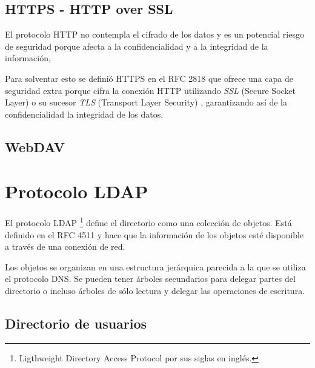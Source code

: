 
  \subsection {HTTPS - HTTP over SSL}

El protocolo HTTP no contempla el cifrado de los datos y es un potencial riesgo de seguridad porque afecta a la confidencialidad y a la integridad de la informaci\'{o}n,

Para solventar esto se defini\'{o} HTTPS en el RFC 2818 \cite{rfc2818} que ofrece una capa de seguridad extra porque cifra la conexi\'{o}n HTTP utilizando \textit{SSL} (Secure Socket Layer) \cite{rfc6101} o su sucesor \textit{TLS} (Transport Layer Security) \cite{rfc5246}, garantizando as\'{i} de la confidencialidad la integridad de los datos.


  \subsection {WebDAV}

\section {Protocolo LDAP}

El protocolo LDAP \footnote{Ligthweight Directory Access Protocol por sus siglas en ingl\'{e}s.} define el directorio como una colecci\'{o}n de objetos. Est\'{a} definido en el RFC 4511 y hace que la informaci\'{o}n de los objetos est\'{e} disponible a trav\'{e}s de una conexi\'{o}n de red.

Los objetos se organizan en una estructura jer\'{a}rquica parecida a la que se utiliza el protocolo DNS. Se pueden tener \'{a}rboles secundarios para delegar partes del directorio o incluso \'{a}rboles de s\'{o}lo lectura y delegar las operaciones de escritura.


  \subsection {Directorio de usuarios}

